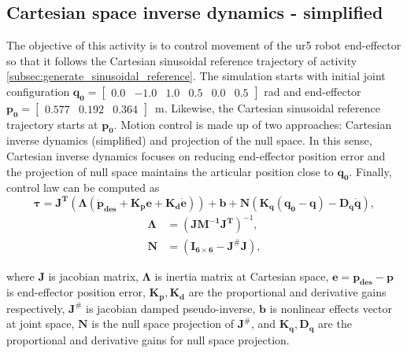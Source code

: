 \graphicspath{{images/act_2.2/}}
\subsection{Cartesian space inverse dynamics - simplified}
The objective of this activity is to control movement of the ur5 robot end-effector so that it follows the Cartesian sinusoidal reference trajectory of activity \ref{subsec:generate_sinusoidal_reference}. The simulation starts with initial joint configuration $\mathbf{q_0}=\begin{bmatrix} 0.0 & -1.0 & 1.0 & 0.5 & 0.0 & 0.5 \end{bmatrix}$ rad and end-effector $\mathbf{p_0}=\begin{bmatrix}  0.577 &   0.192 &   0.364 \end{bmatrix}$~m. Likewise, the Cartesian sinusoidal reference trajectory starts at $\mathbf{p_0}$. Motion control is made up of two approaches: Cartesian inverse dynamics (simplified) and projection of the null space. In this sense, Cartesian inverse dynamics focuses on reducing end-effector position error and the projection of null space maintains the articular position close to $\mathbf{q_0}$. Finally, control law can be computed as 
\begin{equation}
	\boldsymbol{\tau}
	= \mathbf{J^T} (\boldsymbol{\Lambda}( \mathbf{\ddot{p}_{des}} + \mathbf{K_p e} + \mathbf{K_d \dot{e}}))+\mathbf{b} +\mathbf{N} \left(\mathbf{K_q(q_0-q) - D_q \dot{q}} \right),
	\label{eq:cartesian_idyn_N_simplified}
\end{equation} 
\begin{align*}
	\boldsymbol{\Lambda} &= (\mathbf{J M^{-1} J^{T}})^{-1}, \\
	\mathbf{N} &=(\mathbf{I_{6 \times 6}} - \mathbf{J^{\#} J} ),
\end{align*}

\noindent where $\mathbf{J}$ is jacobian matrix, $\boldsymbol{\Lambda}$ is inertia matrix at Cartesian space, $\mathbf{e}=\mathbf{p_{des} - p}$ is end-effector position error, $\mathbf{K_p, K_d}$ are the proportional and derivative gains respectively, $\mathbf{J^{\#}}$ is jacobian damped pseudo-inverse, $\mathbf{b}$ is nonlinear effects vector at joint space, $\mathbf{N}$ is the null space projection of $\mathbf{J^{\#}}$, and $\mathbf{K_q, D_q}$ are the proportional and derivative gains for null space projection. \vspace{.5cm}


